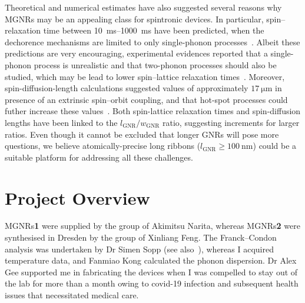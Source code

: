 Theoretical and numerical estimates have also suggested several reasons why \glspl{MGNR} may be an appealing class for spintronic devices. In particular, spin--relaxation time between \SIrange{10}{1000}{\milli\second} have been predicted, when the dechorence mechanisms are limited to only single-phonon processes~\cite{droth2013electron}. Albeit these predictions are very encouraging, experimental evidences reported that a single-phonon process is unrealistic and that two-phonon processes should also be studied, which may be lead to lower spin--lattice relaxation times~\cite{slota2018magnetic}. Moreover, spin-diffusion-length calculations suggested values of approximately $\SI{17}{\micro\metre}$ in presence of an extrinsic spin--orbit coupling, and that hot-spot processes could futher increase these values~\cite{rojas2019ab}. Both spin-lattice relaxation times and spin-diffusion lengths have been linked to the $l_\textrm{GNR}/w_\textrm{GNR}$ ratio, suggesting increments for larger ratios. Even though it cannot be excluded that longer \glspl{GNR} will pose more questions, we believe atomically-precise long ribbons ($l_\textrm{GNR}\ge\SI{100}{\nano\metre}$) could be a suitable platform for addressing all these challenges.

\section{Project Overview}
\glspl{MGNR}\textbf{1} were supplied by the group of Akimitsu Narita, whereas \glspl{MGNR}\textbf{2} were synthesised in Dresden by the group of Xinliang Feng. The Franck--Condon analysis was undertaken by Dr Simen Sopp (see also~\cite{sopp2021phd}), whereas I acquired temperature data, and Fanmiao Kong calculated the phonon dispersion. Dr Alex Gee supported me in fabricating the devices when I was compelled to stay out of the lab for more than a month owing to covid-19 infection and subsequent health issues that necessitated medical care.